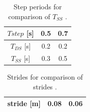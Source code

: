 \documentclass[twocolumn]{jsarticle}
\begin{document}
\begin{table}[h]
  \centering
  \caption{Step periods for comparison of $T_{SS}$ .}
  \vspace{-2mm}
  \begin{tabular}[t]{|c||c|c|}
    \hline
    $Tstep$ [s]& 0.5 & 0.7 \\ \hline
    $T_{DS}$ [s]& 0.2 & 0.2 \\ \hline
   $T_{SS}$ [s]& 0.3 & 0.5 \\ \hline
  \end{tabular}
  \label{tab:table4}
\end{table}
\begin{table}[h]
  \centering
  \caption{Strides for comparison of strides .}
  \vspace{-2mm}
  \begin{tabular}[t]{|c||c|c|}
    \hline
  stride [m]& 0.08 & 0.06 \\\hline 
  \end{tabular}
  \label{tab:table5}
\end{table}
\end{document}
